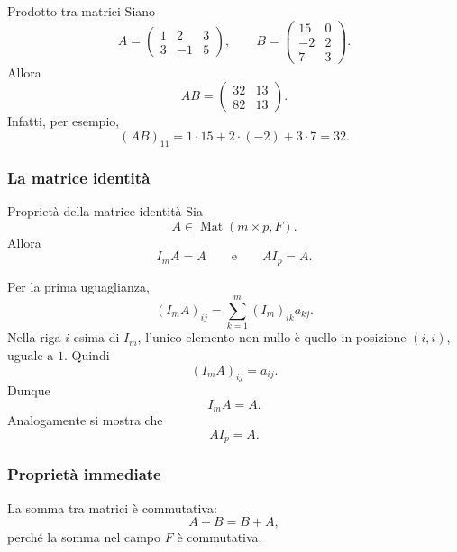 \documentclass[a4paper]{article}
\begin{document}
\begin{snippetexample}{Prodotto tra matrici}
    Siano
    \[
        A=
        \begin{pmatrix}
            1 & 2 & 3\\
            3 & -1 & 5
        \end{pmatrix},
        \qquad
        B=
        \begin{pmatrix}
            15 & 0\\
            -2 & 2\\
            7 & 3
        \end{pmatrix}.
    \]
    Allora
    \[
        AB=
        \begin{pmatrix}
            32 & 13\\
            82 & 13
        \end{pmatrix}.
    \]
    Infatti, per esempio,
    \[
        (AB)_{11}
        =
        1\cdot 15+2\cdot(-2)+3\cdot 7
        =
        32.
    \]
\end{snippetexample}

\subsubsection{La matrice identità}

\begin{snippetproposition}{Proprietà della matrice identità}
    Sia
    \[
        A\in\operatorname{Mat}(m\times p,F).
    \]
    Allora
    \[
        I_mA=A
        \qquad
        \text{e}
        \qquad
        AI_p=A.
    \]
\end{snippetproposition}

\begin{snippetproof}{}
    Per la prima uguaglianza,
    \[
        (I_mA)_{ij}
        =
        \sum_{k=1}^{m}(I_m)_{ik}a_{kj}.
    \]
    Nella riga \(i\)-esima di \(I_m\), l'unico elemento non nullo è quello in posizione \((i,i)\), uguale a \(1\). Quindi
    \[
        (I_mA)_{ij}=a_{ij}.
    \]
    Dunque
    \[
        I_mA=A.
    \]
    Analogamente si mostra che
    \[
        AI_p=A.
    \]
\end{snippetproof}

\subsubsection{Proprietà immediate}

La somma tra matrici è commutativa:
\[
    A+B=B+A,
\]
perché la somma nel campo \(F\) è commutativa.
\end{document}
